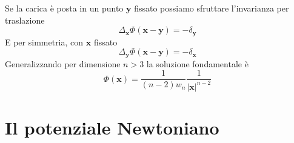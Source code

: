 \documentclass[10pt,a4paper,twoside,openright]{book}
\newcommand{\x}{\mathbf{x}}
\newcommand{\y}{\mathbf{y}}
\begin{document}
Se la carica è posta in un punto $\y$ fissato possiamo sfruttare l'invarianza per traslazione 
\begin{equation*}
	\Delta _{\x} \Phi (\x-\y) =-\delta _{\y}
\end{equation*}
E per simmetria, con $\x$ fissato
\begin{equation*}
	\Delta _{\y} \Phi (\x-\y) =-\delta _{\x}
\end{equation*}
Generalizzando per dimensione $n >3$ la soluzione fondamentale è
\begin{equation*}
	\Phi (\x) =\frac{1}{(n-2) w_{n}}\frac{1}{|\x| ^{n-2}}
\end{equation*}
\section{Il potenziale Newtoniano}
\end{document}
